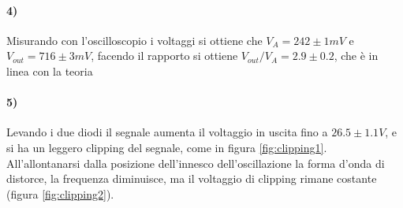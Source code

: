 \documentclass{article}
\begin{document}
\paragraph{4)}
	Misurando con l'oscilloscopio i voltaggi si ottiene che $V_{A}=242\pm1mV$ e $V_{out}=716\pm3mV$, facendo il rapporto si ottiene $V_{out}/V_{A}=2.9\pm0.2$, che è in linea con la teoria
\paragraph{5)}
	Levando i due diodi il segnale aumenta il voltaggio in uscita fino a $26.5\pm1.1 V$, e si ha un leggero clipping del segnale, come in figura \ref{fig:clipping1}.\newline
	All'allontanarsi dalla posizione dell'innesco dell'oscillazione la forma d'onda di distorce, la frequenza diminuisce, ma il voltaggio di clipping rimane costante (figura \ref{fig:clipping2}).
\end{document}
